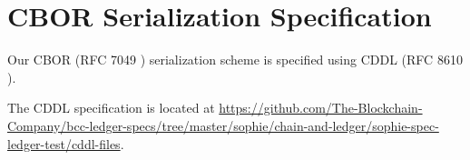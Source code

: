 \section{CBOR Serialization Specification}
\label{sec:cddl}

Our CBOR (RFC 7049 \cite{rfcCBOR})
serialization scheme is specified using
CDDL (RFC 8610 \cite{rfcCDDL}).

The CDDL specification is located at
\url{https://github.com/The-Blockchain-Company/bcc-ledger-specs/tree/master/sophie/chain-and-ledger/sophie-spec-ledger-test/cddl-files}.

% 
